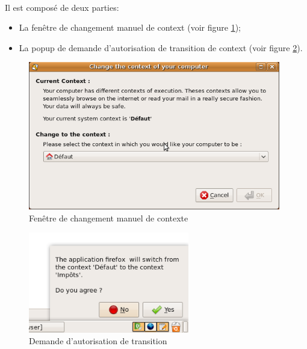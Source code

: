		\paragraph*{}
			Il est composé de deux parties:
			\begin{itemize}
   				\item La fenêtre de changement manuel de context (voir figure \ref{context-notify change context});
   				\item La popup de demande d'autorisation de transition de context (voir figure \ref{context-notify autorisation}).
   			\end{itemize}
			
		\begin{figure}[!h]
			\includegraphics[width=11cm]{images/contextnotifydlg.png}
			\caption{Fenêtre de changement manuel de contexte}
			\label{context-notify change context}
		\end{figure}
		
		\begin{figure}[!h]
			\includegraphics[width=7cm]{images/contextnotifypopup.png}
			\caption{Demande d'autorisation de transition}
			\label{context-notify autorisation}
		\end{figure}


